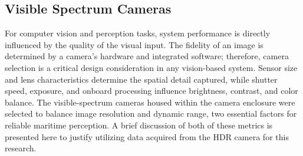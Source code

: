 \documentclass{erauthesis}
\begin{document}


\subsection{Visible Spectrum Cameras} \label{visual_cameras}


For computer vision and perception tasks, system performance is directly influenced by the quality of the visual input.
The fidelity of an image is determined by a camera's hardware and integrated software; therefore, camera selection is a critical design consideration in any vision-based system. 
Sensor size and lens characteristics determine the spatial detail captured, while shutter speed, exposure, and onboard processing influence brightness, contrast, and color balance. 
The visible-spectrum cameras housed within the camera enclosure were selected to balance image resolution and dynamic range, two essential factors for reliable maritime perception.
A brief discussion of both of these metrics is presented here to justify utilizing data acquired from the \ac{HDR} camera for this research.
\end{document}
